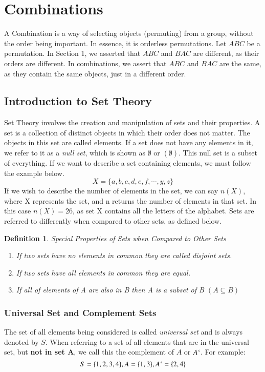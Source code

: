 \documentclass[final,1p,12pt]{elsarticle}
\newtheorem{definition}{Definition}
\begin{document}
\section{Combinations}
A Combination is a way of selecting objects (permuting) from a group, without the order being important. In essence, it is orderless permutations. Let $ABC$ be a permutation. In Section 1, we asserted that $ABC$ and $BAC$ are different, as their orders are different. In combinations, we assert that $ABC$ and $BAC$ are the same, as they contain the same objects, just in a different order.

    \subsection{Introduction to Set Theory}
    Set Theory involves the creation and manipulation of sets and their properties. A set is a collection of distinct objects in which their order does not matter. The objects in this set are called elements. If a set does not have any elements in it, we refer to it as a \emph{null set}, which is shown as $\emptyset$ or $(\emptyset)$. This null set is a subset of everything. If we want to describe a set containing elements, we must follow the example below.
    \[X = \{a,b,c,d,e,f,\cdots,y,z\}\] 
    If we wish to describe the number of elements in the set, we can say $n(X)$, where X represents the set, and n returns the number of elements in that set. In this case $n(X) = 26$, as set X contains all the letters of the alphabet. Sets are referred to differently when compared to other sets, as defined below.
    \begin{definition}
    Special Properties of Sets when Compared to Other Sets
    \begin{enumerate}
        \item If two sets have no elements in common they are called disjoint sets.
        \item If two sets have all elements in common they are equal.
        \item If all of elements of A are also in B then A is a subset of B $(A\subseteq B)$
    \end{enumerate}
    \end{definition}
    \subsubsection{Universal Set and Complement Sets}
    The set of all elements being considered is called \emph{universal set} and is always denoted by $S$. When referring to a set of all elements that are in the universal set, but \textbf{not in set A}, we call this the complement of $A$ or $A`$. For example: 
    \[S = \{1,2,3,4\}, A = \{1,3\}, A`=\{2,4\}\]
\end{document}
